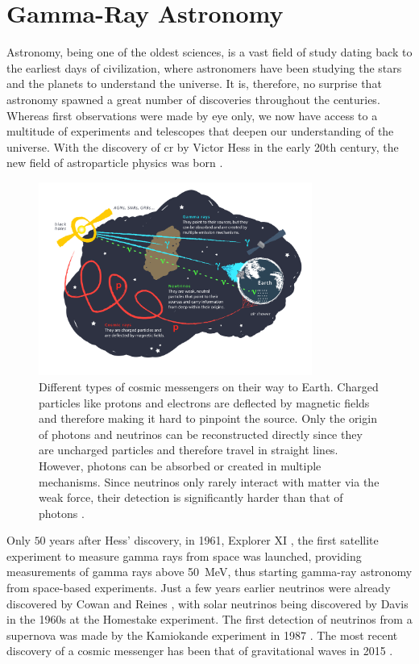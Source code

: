 \chapter{Gamma-Ray Astronomy}
\label{ch:gamma-ray-astronomy}

Astronomy, being one of the oldest sciences, is a vast field of study dating back to the earliest
days of civilization, where astronomers have been studying the stars and the planets to understand
the universe. It is, therefore, no surprise that astronomy spawned a great number of discoveries
throughout the centuries. Whereas first observations were made by eye only, we now have access to a multitude
of experiments and telescopes that deepen our understanding of the universe. With the discovery of
\gls{cr} by Victor Hess in the early 20th century, the new field of astroparticle physics was born \cite{longair1981}.

\begin{figure}
    \centering
    \includegraphics[width=0.8\textwidth]{graphics/figure5.png}
    \caption{Different types of cosmic messengers on their way to Earth. Charged particles like protons and electrons
    are deflected by magnetic fields and therefore making it hard to pinpoint the source. Only the
    origin of photons and neutrinos can be reconstructed directly since they are uncharged particles
    and therefore travel in straight lines. However, photons can be absorbed or created in multiple
    mechanisms. Since neutrinos only rarely interact with matter via the weak force, their detection
    is significantly harder than that of photons \cite{fig5}.}
    \label{fig:fig5}
\end{figure}

Only \(\num{50}\) years after Hess' discovery, in 1961, Explorer XI \cite{explorer11}, the first satellite experiment
to measure gamma rays from space was launched, providing measurements of gamma rays above
\SI{50}{\mega\eV}, thus starting gamma-ray astronomy from space-based experiments. Just a few years
earlier neutrinos were already discovered by Cowan and Reines \cite{cowan1956}, with solar neutrinos being
discovered by Davis \etal{} \cite{davis} in the 1960s at the Homestake experiment.
The first detection of neutrinos from a supernova was made by the Kamiokande experiment in 1987
\cite{kamiokande1987}. The most recent discovery of a cosmic messenger has been that of gravitational
waves in 2015 \cite{grav_waves}.

